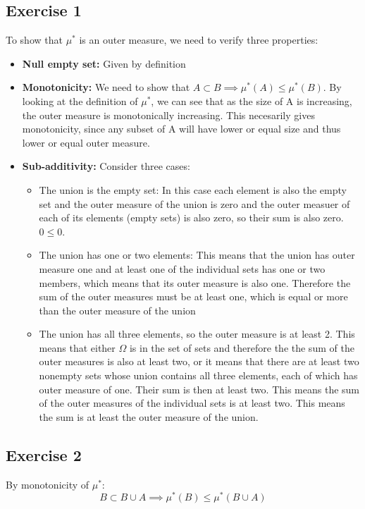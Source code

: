 \documentclass{article}
\begin{document}
\subsection*{Exercise 1}
To show that $\mu^*$ is an outer measure, we need to verify three properties:
\begin{itemize}
    \item \textbf{Null empty set:} Given by definition
    \item \textbf{Monotonicity:} We need to show that $A \subset B \implies \mu^*(A) \leq \mu^*(B)$. By looking at the definition of $\mu^*$, we can see that as the size of A is increasing, the outer measure is monotonically increasing. This necesarily gives monotonicity, since any subset of A will have lower or equal size and thus lower or equal outer measure.
    \item \textbf{Sub-additivity:} Consider three cases:
        \begin{itemize}
            \item The union is the empty set: In this case each element is also the empty set and the outer measure of the union is zero and the outer measuer of each of its elements (empty sets) is also zero, so their sum is also zero. $0 \leq 0$.
            \item The union has one or two elements: This means that the union has outer measure one and at least one of the individual sets has one or two members, which means that its  outer measure is also one. Therefore the sum of the outer measures must be at least one, which is equal or more than the outer measure of the union
            \item The union has all three elements, so the outer measure is at least 2. This means that either $\Omega$ is in the set of sets and therefore the the sum of the outer measures is also at least two, or it means that there are at least two nonempty sets whose union contains all three elements, each of which has outer measure of one. Their sum is then at least two. This means the sum of the outer measures of the individual sets is at least two. This means the sum is at least the outer measure of the union.
        \end{itemize}
\end{itemize}

\subsection*{Exercise 2}
By monotonicity of $\mu^*$:
\[
    B \subset B \cup A \implies \mu^*(B) \leq \mu^*(B \cup A)
\]
\end{document}
